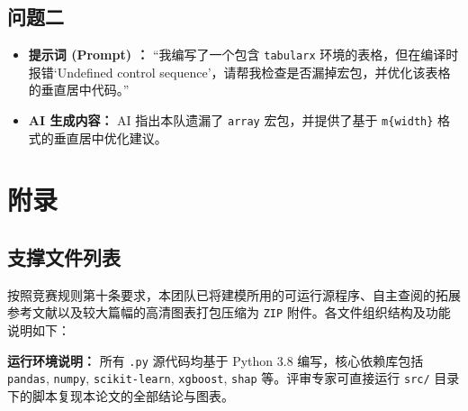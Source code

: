 \documentclass[a4paper, 12pt]{ctexart} %
\begin{document}
\subsection{问题二}
\begin{itemize}[itemsep=0pt, parsep=0pt]
    \item \textbf{提示词 (Prompt) ：} “我编写了一个包含 \texttt{tabularx} 环境的表格，但在编译时报错‘Undefined control sequence’，请帮我检查是否漏掉宏包，并优化该表格的垂直居中代码。”
    \item \textbf{AI 生成内容：} AI 指出本队遗漏了 \texttt{array} 宏包，并提供了基于 \texttt{m\{width\}} 格式的垂直居中优化建议。
\end{itemize}

\newpage
\section{附录}
\subsection{支撑文件列表}
按照竞赛规则第十条要求，本团队已将建模所用的可运行源程序、自主查阅的拓展参考文献以及较大篇幅的高清图表打包压缩为 \texttt{ZIP} 附件。各文件组织结构及功能说明如下：

\vspace{1em} %


\vspace{1em}
\noindent\textbf{运行环境说明：} 
所有 \texttt{.py} 源代码均基于 Python 3.8 编写，核心依赖库包括 \texttt{pandas}, \texttt{numpy}, \texttt{scikit-learn}, \texttt{xgboost}, \texttt{shap} 等。评审专家可直接运行 \texttt{src/} 目录下的脚本复现本论文的全部结论与图表。

\newpage
\end{document}
